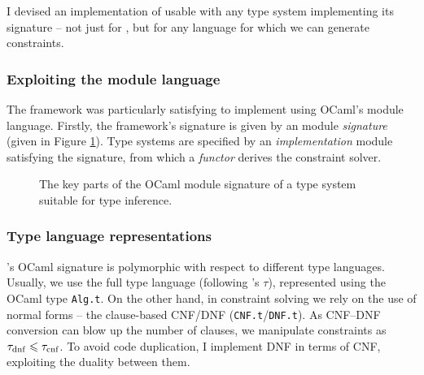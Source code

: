 I devised an implementation of \inference{} usable with any type system implementing its signature -- not just for \fabric{}, but for any language for which we can generate constraints.


\subsubsection{Exploiting the module language} The framework was particularly satisfying to implement using OCaml's module language. Firstly, the framework's signature is given by an module \emph{signature} (given in Figure \ref{fig:inference-signature}). Type systems are specified by an \emph{implementation} module satisfying the signature, from which a \emph{functor} derives the constraint solver.

\begin{figure}[p]
    \centering
    
    \caption{The key parts of the OCaml module signature of a type system suitable for type inference.}
    \label{fig:inference-signature}
\end{figure}

\subsubsection{Type language representations} \inference{}'s OCaml signature is polymorphic with respect to different type languages. 
Usually, we use the full type language (following \inference{}'s $\tau$), represented using the OCaml type \texttt{Alg.t}. On the other hand, in constraint solving we rely on the use of normal forms -- the clause-based CNF/DNF (\texttt{CNF.t}/\texttt{DNF.t}). As CNF--DNF conversion can blow up the number of clauses, we manipulate constraints as $\tau_\mathrm{dnf} \leqslant \tau_\mathrm{cnf}$. To avoid code duplication, I implement DNF in terms of CNF, exploiting the duality between them. 


